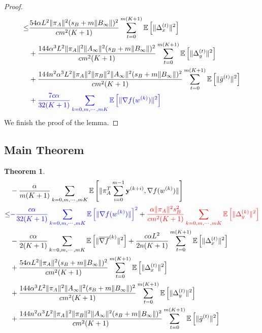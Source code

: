 \documentclass{article}
\newtheorem{theorem}{Theorem}
\newcommand{\vy}{{\mathbf{y}}}
\newcommand{\EE}[1]{\mathbb{E}\left[#1\right]}
\newcommand{\norm}[1]{\| #1 \|}
\begin{document}
\begin{proof}
\begin{align*}
    \leq&\frac{54\alpha L^2\norm{\pi_A}^2(s_B+m\norm{B_{\infty}})^2}{cm^2(K+1)}\sum_{t=0}^{m(K+1)}\EE{\norm{\Delta_x^{(t)}}^2}\\&+\frac{144\alpha^3L^2\norm{\pi_A}^2\norm{A_{\infty}}^2(s_B+m\norm{B_{\infty}})^2}{cm^2(K+1)}\sum_{t=0}^{m(K+1)}\EE{\norm{\Delta_y^{(t)}}^2}
    \\&+\frac{144n^2\alpha^3L^2\norm{\pi_A}^2\norm{\pi_B}^2\norm{A_{\infty}}^2(s_B+m\norm{B_{\infty}})^2}{cm^2(K+1)}\sum_{t=0}^{m(K+1)}\EE{\norm{\bar{g}^{(t)}}^2}\\&+\textcolor{blue}{\frac{7c\alpha}{32(K+1)}\sum_{k=0,m,\cdots,mK}\EE{\norm{\nabla f(w^{(k)})}^2}}
  \end{align*}
  We finish the proof of the lemma.
\end{proof}

\subsection{Main Theorem}
\begin{theorem}
  \begin{align*}
    &-\frac{\alpha}{m(K+1)}\sum_{k=0,m,\cdots,mK}\EE{\norm{\pi_A^T\sum_{i=0}^{m-1}\vy^{(k+i)},\nabla f(w^{(k)}) }}\\
    \leq& \textcolor{blue}{-\frac{c\alpha}{32(K+1)}\sum_{k=0,m,\cdots,mK}\EE{\norm{\nabla f(w^{(k)})}}^2}+\textcolor{red}{\frac{\alpha\norm{\pi_A}^2s_B^2}{cm^2(K+1)}\sum_{k=0,m,\cdots,mK}\EE{\norm{\Delta_y^{(k)}}^2}}\\&-\frac{c\alpha }{2(K+1)}\sum_{k=0,m,\cdots,mK}\EE{\norm{\overline{\nabla f}^{(k)}}^2}+\frac{c\alpha L^2}{2n(K+1)}\sum_{t=0}^{m(K+1)}\EE{\norm{\Delta_x^{(t)}}^2}\\&+\frac{54\alpha L^2\norm{\pi_A}^2(s_B+m\norm{B_{\infty}})^2}{cm^2(K+1)}\sum_{t=0}^{m(K+1)}\EE{\norm{\Delta_x^{(t)}}^2}\\&+\frac{144\alpha^3L^2\norm{\pi_A}^2\norm{A_{\infty}}^2(s_B+m\norm{B_{\infty}})^2}{cm^2(K+1)}\sum_{t=0}^{m(K+1)}\EE{\norm{\Delta_y^{(t)}}^2}
    \\&+\frac{144n^2\alpha^3L^2\norm{\pi_A}^2\norm{\pi_B}^2\norm{A_{\infty}}^2(s_B+m\norm{B_{\infty}})^2}{cm^2(K+1)}\sum_{t=0}^{m(K+1)}\EE{\norm{\bar{g}^{(t)}}^2}
  \end{align*}
\end{theorem}
\end{document}
